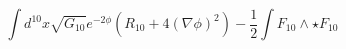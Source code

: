 \begin{equation*}
\int d^{10}x\sqrt{G_{10}}e^{-2\phi }\left( R_{10}+4\left( \nabla \phi
\right) ^{2}\right) -\frac{1}{2}\int F_{10}\wedge \star F_{10}
\end{equation*}

